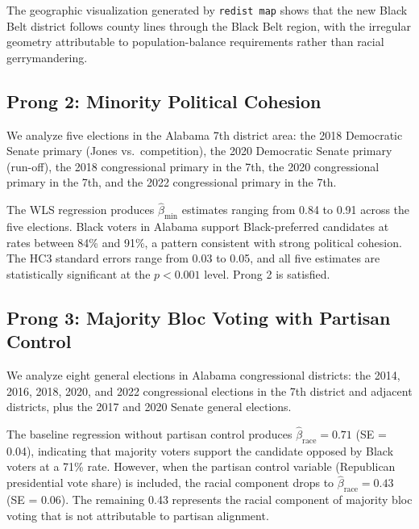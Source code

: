 The geographic visualization generated by \texttt{redist map} shows that the
new Black Belt district follows county lines through the Black Belt region,
with the irregular geometry attributable to population-balance requirements
rather than racial gerrymandering.

\subsection{Prong 2: Minority Political Cohesion}

We analyze five elections in the Alabama 7th district area: the 2018 Democratic
Senate primary (Jones vs.\ competition), the 2020 Democratic Senate primary
(run-off), the 2018 congressional primary in the 7th, the 2020 congressional
primary in the 7th, and the 2022 congressional primary in the 7th.

The WLS regression produces $\hat{\beta}_{\text{min}}$ estimates ranging from
0.84 to 0.91 across the five elections.  Black voters in Alabama support
Black-preferred candidates at rates between 84\% and 91\%, a pattern
consistent with strong political cohesion.  The HC3 standard errors range
from 0.03 to 0.05, and all five estimates are statistically significant at
the $p < 0.001$ level.  Prong 2 is satisfied.

\subsection{Prong 3: Majority Bloc Voting with Partisan Control}

We analyze eight general elections in Alabama congressional districts: the
2014, 2016, 2018, 2020, and 2022 congressional elections in the 7th district
and adjacent districts, plus the 2017 and 2020 Senate general elections.

The baseline regression without partisan control produces $\hat{\beta}_{\text{race}}
= 0.71$ (SE = 0.04), indicating that majority voters support the candidate
opposed by Black voters at a 71\% rate.  However, when the partisan control
variable (Republican presidential vote share) is included, the racial component
drops to $\hat{\beta}_{\text{race}} = 0.43$ (SE = 0.06).  The remaining 0.43
represents the racial component of majority bloc voting that is not attributable
to partisan alignment.

